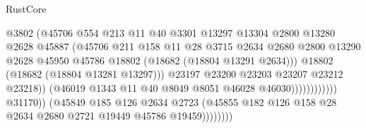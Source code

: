 \begin{lexlean}{RustCore}
\begin{coremodule}
                                              @3802
                                              (@45706
                                                @554
                                                @213
                                                @11
                                                @40
                                                @3301
                                                @13297
                                                @13304
                                                @2800
                                                @13280
                                                @2628
                                                @45887
                                                (@45706
                                                  @211
                                                  @158
                                                  @11
                                                  @28
                                                  @3715
                                                  @2634
                                                  @2680
                                                  @2800
                                                  @13290
                                                  @2628
                                                  @45950
                                                  @45786
                                                  @18802
                                                  (@18682 (@18804 @13291 @2634)))
                                                @18802
                                                (@18682 (@18804 @13281 @13297)))
                                              @23197
                                              @23200
                                              @23203
                                              @23207
                                              @23212
                                              @23218))
                                          (@46019
                                            @1343
                                            @11
                                            @40
                                            @8049
                                            @8051
                                            @46028
                                            @46030))))))))))))
                    @31170))
                (@45849
                  @185
                  @126
                  @2634
                  @2723
                  (@45855 @182 @126 @158 @28 @2634 @2680 @2721 @19449 @45786 @19459))))))))

\end{coremodule}
\end{lexlean}
